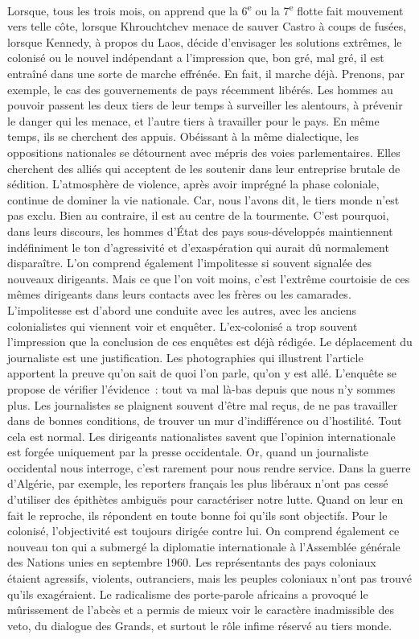 \documentclass[french,twoside]{book} %
\begin{document}
\bigbreak
\noindent Lorsque, tous les trois mois, on apprend que la 6\textsuperscript{e} ou la 7\textsuperscript{e} flotte fait mouvement vers telle côte, lorsque Khrouchtchev menace de sauver Castro à coups de fusées, lorsque Kennedy, à propos du Laos, décide d’envisager les solutions extrêmes, le colonisé ou le nouvel indépendant a l’impression que, bon gré, mal gré, il est entraîné dans une sorte de marche effrénée. En fait, il marche déjà. Prenons, par exemple, le cas des gouvernements de pays récemment libérés. Les hommes au pouvoir passent les deux tiers de leur temps à surveiller les alentours, à prévenir le danger qui les menace, et l’autre tiers à travailler pour le pays. En même temps, ils se cherchent des appuis. Obéissant à la même dialectique, les oppositions nationales se détournent avec mépris des voies parlementaires. Elles cherchent   des alliés qui acceptent de les soutenir dans leur entreprise brutale de sédition. L’atmosphère de violence, après avoir imprégné la phase coloniale, continue de dominer la vie nationale. Car, nous l’avons dit, le tiers monde n’est pas exclu. Bien au contraire, il est au centre de la tourmente. C’est pourquoi, dans leurs discours, les hommes d’État des pays sous-développés maintiennent indéfiniment le ton d’agressivité et d’exaspération qui aurait dû normalement disparaître. L’on comprend également l’impolitesse si souvent signalée des nouveaux dirigeants. Mais ce que l’on voit moins, c’est l’extrême courtoisie de ces mêmes dirigeants dans leurs contacts avec les frères ou les camarades. L’impolitesse est d’abord une conduite avec les autres, avec les anciens colonialistes qui viennent voir et enquêter. L’ex-colonisé a trop souvent l’impression que la conclusion de ces enquêtes est déjà rédigée. Le déplacement du journaliste est une justification. Les photographies qui illustrent l’article apportent la preuve qu’on sait de quoi l’on parle, qu’on y est allé. L’enquête se propose de vérifier l’évidence : tout va mal là-bas depuis que nous n’y sommes plus. Les journalistes se plaignent souvent d’être mal reçus, de ne pas travailler dans de bonnes conditions, de trouver un mur d’indifférence ou d’hostilité. Tout cela est normal. Les dirigeants nationalistes savent que l’opinion internationale est forgée uniquement par la presse occidentale. Or, quand un journaliste occidental nous interroge, c’est rarement pour nous rendre service. Dans la guerre d’Algérie, par exemple, les reporters français les plus libéraux n’ont pas cessé d’utiliser des épithètes ambiguës pour caractériser notre lutte. Quand on leur en fait le reproche, ils répondent en toute bonne foi qu’ils sont objectifs. Pour le colonisé, l’objectivité est toujours dirigée contre lui. On comprend également ce nouveau ton qui a submergé la diplomatie internationale à l’Assemblée générale des Nations unies en septembre 1960. Les représentants des pays coloniaux étaient agressifs, violents, outranciers, mais les peuples coloniaux n’ont pas trouvé qu’ils exagéraient. Le radicalisme des porte-parole africains a provoqué le mûrissement de l’abcès et a permis de mieux voir le   caractère inadmissible des veto, du dialogue des Grands, et surtout le rôle infime réservé au tiers monde.\par
\end{document}
